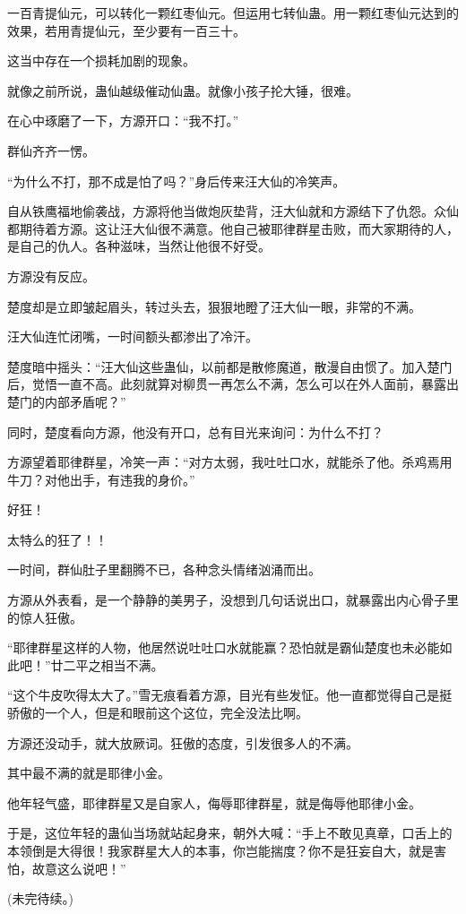 \begin{this_body}
一百青提仙元，可以转化一颗红枣仙元。但运用七转仙蛊。用一颗红枣仙元达到的效果，若用青提仙元，至少要有一百三十。

这当中存在一个损耗加剧的现象。

就像之前所说，蛊仙越级催动仙蛊。就像小孩子抡大锤，很难。

在心中琢磨了一下，方源开口：“我不打。”

群仙齐齐一愣。

“为什么不打，那不成是怕了吗？”身后传来汪大仙的冷笑声。

自从铁鹰福地偷袭战，方源将他当做炮灰垫背，汪大仙就和方源结下了仇怨。众仙都期待着方源。这让汪大仙很不满意。他自己被耶律群星击败，而大家期待的人，是自己的仇人。各种滋味，当然让他很不好受。

方源没有反应。

楚度却是立即皱起眉头，转过头去，狠狠地瞪了汪大仙一眼，非常的不满。

汪大仙连忙闭嘴，一时间额头都渗出了冷汗。

楚度暗中摇头：“汪大仙这些蛊仙，以前都是散修魔道，散漫自由惯了。加入楚门后，觉悟一直不高。此刻就算对柳贯一再怎么不满，怎么可以在外人面前，暴露出楚门的内部矛盾呢？”

同时，楚度看向方源，他没有开口，总有目光来询问：为什么不打？

方源望着耶律群星，冷笑一声：“对方太弱，我吐吐口水，就能杀了他。杀鸡焉用牛刀？对他出手，有违我的身价。”

好狂！

太特么的狂了！！

一时间，群仙肚子里翻腾不已，各种念头情绪汹涌而出。

方源从外表看，是一个静静的美男子，没想到几句话说出口，就暴露出内心骨子里的惊人狂傲。

“耶律群星这样的人物，他居然说吐吐口水就能赢？恐怕就是霸仙楚度也未必能如此吧！”廿二平之相当不满。

“这个牛皮吹得太大了。”雪无痕看着方源，目光有些发怔。他一直都觉得自己是挺骄傲的一个人，但是和眼前这个这位，完全没法比啊。

方源还没动手，就大放厥词。狂傲的态度，引发很多人的不满。

其中最不满的就是耶律小金。

他年轻气盛，耶律群星又是自家人，侮辱耶律群星，就是侮辱他耶律小金。

于是，这位年轻的蛊仙当场就站起身来，朝外大喊：“手上不敢见真章，口舌上的本领倒是大得很！我家群星大人的本事，你岂能揣度？你不是狂妄自大，就是害怕，故意这么说吧！”

(未完待续。)


\end{this_body}
